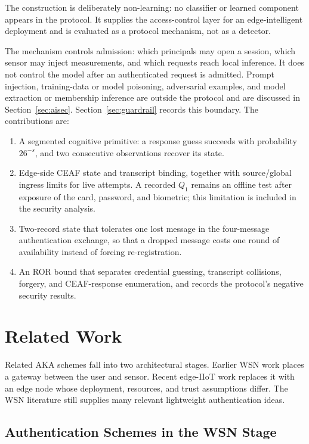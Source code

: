 \documentclass[cmc,article,submit,moreauthors,pdftex]{Definitions/tsp}
\begin{document}
The construction is deliberately non-learning: no classifier or learned component appears in the protocol. It supplies the access-control layer for an edge-intelligent deployment and is evaluated as a protocol mechanism, not as a detector.

The mechanism controls admission: which principals may open a session, which sensor may inject measurements, and which requests reach local inference. It does not control the model after an authenticated request is admitted. Prompt injection, training-data or model poisoning, adversarial examples, and model extraction or membership inference are outside the protocol and are discussed in Section~\ref{sec:aisec}. Section~\ref{sec:guardrail} records this boundary. The contributions are:

\begin{enumerate}
\item A segmented cognitive primitive: a response guess succeeds with probability $26^{-s}$, and two consecutive observations recover its state.
\item Edge-side CEAF state and transcript binding, together with source/global ingress limits for live attempts. A recorded $Q_1$ remains an offline test after exposure of the card, password, and biometric; this limitation is included in the security analysis.
\item Two-record state that tolerates one lost message in the four-message authentication exchange, so that a dropped message costs one round of availability instead of forcing re-registration.
\item An ROR bound that separates credential guessing, transcript collisions, forgery, and CEAF-response enumeration, and records the protocol's negative security results.
\end{enumerate}

\section{Related Work}

Related AKA schemes fall into two architectural stages. Earlier WSN work places a gateway between the user and sensor. Recent edge-IIoT work replaces it with an edge node whose deployment, resources, and trust assumptions differ. The WSN literature still supplies many relevant lightweight authentication ideas.

\subsection{Authentication Schemes in the WSN Stage}
\end{document}
